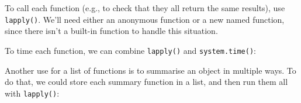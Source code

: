 To call each function (e.g., to check that they all return the same
results), use \texttt{lapply()}. We'll need either an anonymous function
or a new named function, since there isn't a built-in function to handle
this situation.

\begin{Shaded}
\begin{Highlighting}[]
\CommentTok{#> }
\CommentTok{#> }

\StringTok{ }
\CommentTok{#> }
\CommentTok{#> }
\end{Highlighting}
\end{Shaded}

To time each function, we can combine \texttt{lapply()} and
\texttt{system.time()}:

\begin{Shaded}
\begin{Highlighting}[]
\NormalTok{(}
\CommentTok{#> }
\CommentTok{#> }
\end{Highlighting}
\end{Shaded}

Another use for a list of functions is to summarise an object in
multiple ways. To do that, we could store each summary function in a
list, and then run them all with \texttt{lapply()}:

\begin{Shaded}
\begin{Highlighting}[]
\StringTok{ }\NormalTok{:}
\StringTok{ }\NormalTok{(}
   
   
   
\NormalTok{)}
\CommentTok{#> }
\CommentTok{#> }
\end{Highlighting}
\end{Shaded}\vspace*{-2pt}

